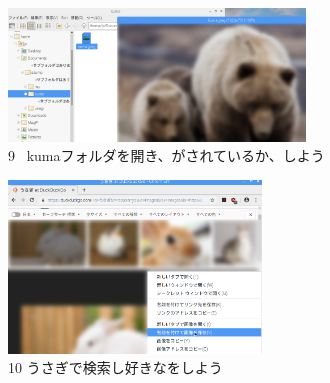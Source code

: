 \documentclass[a4paper,12pt]{jarticle}
\begin{document}
\begin{figure}[t]
  \begin{minipage}{\textwidth}
    \begin{minipage}{7.882cm}
      \includegraphics[width=7.872cm]{textbook-img102.png}\\
      9 \ kumaフォルダを開き、がされているか、しよう
    \end{minipage}
    \begin{minipage}{2.582cm}
    \end{minipage}
    \begin{minipage}{6.582cm}
      \includegraphics[width=6.71cm]{textbook-img101.png}\\
      10 うさぎで検索し好きなをしよう
    \end{minipage}
  \end{minipage}

  \vspace{60mm}

\end{figure}



\bigskip



\clearpage
\end{document}
